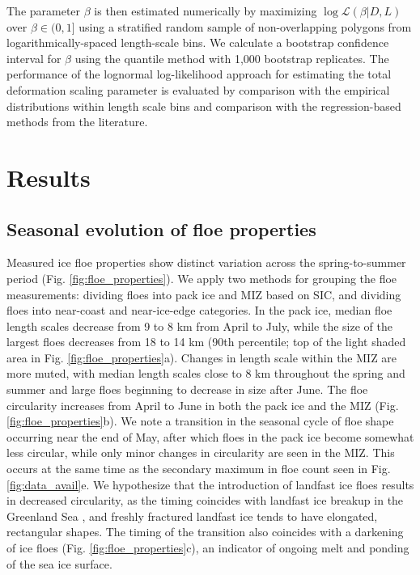 \documentclass[review, jog]{igs}
\begin{document}
The parameter $\beta$ is then estimated numerically by maximizing $\log \mathcal{L}(\beta | D, L)$ over $\beta \in (0, 1]$ using a stratified random sample of non-overlapping polygons from logarithmically-spaced length-scale bins. We calculate a bootstrap confidence interval for $\beta$ using the quantile method with 1,000 bootstrap replicates.  
The performance of the lognormal log-likelihood approach for estimating the total deformation scaling parameter is evaluated by comparison with the empirical distributions within length scale bins and comparison with the regression-based methods from the literature.

\section{Results}
\subsection{Seasonal evolution of floe properties}
Measured ice floe properties show distinct variation across the spring-to-summer period (Fig. \ref{fig:floe_properties}).
We apply two methods for grouping the floe measurements: dividing floes into pack ice and MIZ based on SIC, and dividing floes into near-coast and near-ice-edge categories.
In the pack ice, median floe length scales decrease from 9 to 8 km from April to July, while the size of the largest floes decreases from 18 to 14 km (90th percentile; top of the light shaded area in Fig. \ref{fig:floe_properties}a). 
Changes in length scale within the MIZ are more muted, with median length scales close to 8 km throughout the spring and summer and large floes beginning to decrease in size after June.
The floe circularity increases from April to June in both the pack ice and the MIZ (Fig. \ref{fig:floe_properties}b).
We note a transition in the seasonal cycle of floe shape occurring near the end of May, after which floes in the pack ice become somewhat less circular, while only minor changes in circularity are seen in the MIZ. 
This occurs at the same time as the secondary maximum in floe count seen in Fig. \ref{fig:data_avail}e.
We hypothesize that the introduction of landfast ice floes results in decreased circularity, as the timing coincides with landfast ice breakup in the Greenland Sea \citep{wadhams1981_IceCover, walsh2022_SeaIce}, and freshly fractured landfast ice tends to have elongated, rectangular shapes.
The timing of the transition also coincides with a darkening of ice floes (Fig. \ref{fig:floe_properties}c), an indicator of ongoing melt and ponding of the sea ice surface.
\end{document}
